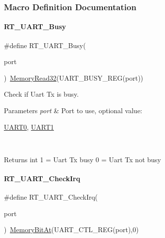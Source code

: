 \subsubsection{Macro Definition Documentation}
\mbox{\label{a00173_a3ab834a97a200601f16b923a705f3f01}} 
\paragraph{\texorpdfstring{R\+T\+\_\+\+U\+A\+R\+T\+\_\+\+Busy}{RT\_UART\_Busy}}
{\footnotesize\ttfamily \#define R\+T\+\_\+\+U\+A\+R\+T\+\_\+\+Busy(\begin{DoxyParamCaption}\item[{}]{port }\end{DoxyParamCaption})~\mbox{\hyperlink{a00068_a2d484dc15bdf30ee11ab3b05f31f0e16}{Memory\+Read32}}(U\+A\+R\+T\+\_\+\+B\+U\+S\+Y\+\_\+\+R\+EG(port))}



Check if Uart Tx is busy. 


\begin{DoxyParams}{Parameters}
{\em port} & Port to use, optional value\+:
\begin{DoxyCode}
\mbox{\hyperlink{a00173_a0508661f121639ffdee7de2353a0def2}{UART0}}, \mbox{\hyperlink{a00173_a8d69bf04d07af4fbbab5a8bd291f65ff}{UART1}}
\end{DoxyCode}
 \\
\hline
\end{DoxyParams}
\begin{DoxyReturn}{Returns}
int 1 = Uart Tx busy 0 = Uart Tx not busy 
\end{DoxyReturn}
\mbox{\label{a00173_a3e29e879f76b82a13419f4d59a1c3053}} 
\paragraph{\texorpdfstring{R\+T\+\_\+\+U\+A\+R\+T\+\_\+\+Check\+Irq}{RT\_UART\_CheckIrq}}
{\footnotesize\ttfamily \#define R\+T\+\_\+\+U\+A\+R\+T\+\_\+\+Check\+Irq(\begin{DoxyParamCaption}\item[{}]{port }\end{DoxyParamCaption})~\mbox{\hyperlink{a00068_afc530c7e6b49b0ca97c1ad9dac1c4750}{Memory\+Bit\+At}}(U\+A\+R\+T\+\_\+\+C\+T\+L\+\_\+\+R\+EG(port),0)}



